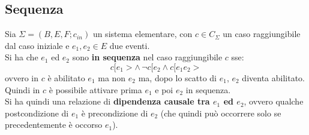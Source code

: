 \subsection{Sequenza}
Sia $\Sigma = (B,E,F;c_{in})$ un sistema elementare, con $c\in C_\Sigma$ un caso raggiungibile dal caso iniziale e $e_1,e_2\in E$ due eventi.\\ 
Si ha che $e_1$ ed $e_2$ sono \textbf{in sequenza} nel caso raggiungibile $c$ sse: \[c[e_1>\wedge\, \neg c[e_2\wedge c[e_1e_2>\] ovvero in $c$ è abilitato $e_1$ ma non $e_2$ ma, dopo lo scatto di $e_1$, $e_2$ diventa abilitato. Quindi in $c$ è possibile attivare prima $e_1$ e poi $e_2$ in sequenza.\\ 
Si ha quindi una relazione di \textbf{dipendenza causale tra $e_1$ ed $e_2$}, ovvero qualche postcondizione di $e_1$ è precondizione di $e_2$ (che quindi può occorrere solo se precedentemente è occorso $e_1$).